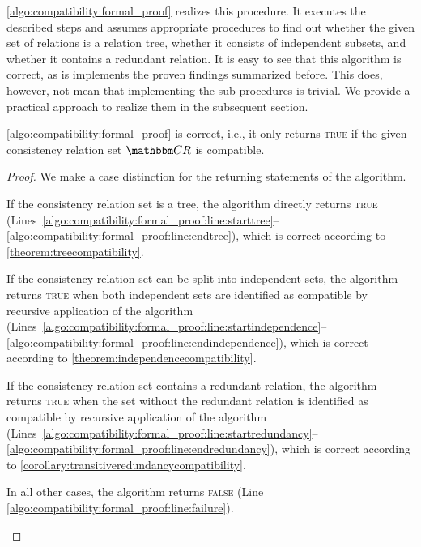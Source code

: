 \begin{algorithm}
    
    \caption[Proof for compatibility of consistency relations]{Proof for compatibility of consistency relations.}
    \label{algo:compatibility:formal_proof}
\end{algorithm}

\autoref{algo:compatibility:formal_proof} realizes this procedure.
It executes the described steps and assumes appropriate procedures to find out whether the given set of relations is a relation tree, whether it consists of independent subsets, and whether it contains a redundant relation.
It is easy to see that this algorithm is correct, as is implements the proven findings summarized before.
This does, however, not mean that implementing the sub-procedures is trivial.
We provide a practical approach to realize them in the subsequent section.

\begin{theorem}
    \label{theorem:compatibilityalgorithmcorrectness}
    \autoref{algo:compatibility:formal_proof} is correct, i.e., it only returns \textsc{true} if the given consistency relation set $\consistencyrelationset{CR}$ is compatible.
\end{theorem}

\begin{proof}
    We make a case distinction for the returning statements of the algorithm.
    \begin{longenumerate}
        \item If the consistency relation set is a tree, the algorithm directly returns \textsc{true} (Lines~\ref{algo:compatibility:formal_proof:line:starttree}--\ref{algo:compatibility:formal_proof:line:endtree}), which is correct according to \autoref{theorem:treecompatibility}.
        \item If the consistency relation set can be split into independent sets, the algorithm returns \textsc{true} when both independent sets are identified as compatible by recursive application of the algorithm (Lines~\ref{algo:compatibility:formal_proof:line:startindependence}--\ref{algo:compatibility:formal_proof:line:endindependence}), which is correct according to \autoref{theorem:independencecompatibility}.
        \item If the consistency relation set contains a redundant relation, the algorithm returns \textsc{true} when the set without the redundant relation is identified as compatible by recursive application of the algorithm (Lines~\ref{algo:compatibility:formal_proof:line:startredundancy}--\ref{algo:compatibility:formal_proof:line:endredundancy}), which is correct according to \autoref{corollary:transitiveredundancycompatibility}.
        \item In all other cases, the algorithm returns \textsc{false} (Line \ref{algo:compatibility:formal_proof:line:failure}).
        \qedhere
    \end{longenumerate}
\end{proof}


